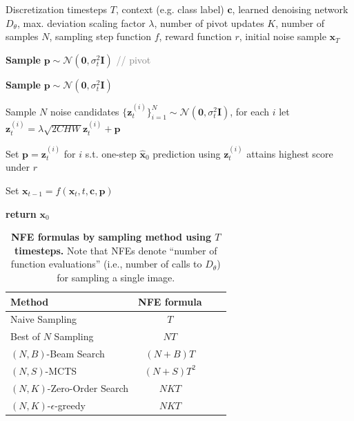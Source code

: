 \documentclass{article}
\newcommand{\x}{\mathbf{x}}
\begin{document}
\begin{algorithm}
\caption{Zero-Order Search}
\label{alg:zo}
\begin{algorithmic}[1]
\Require Discretization timesteps $T$, 
         context (e.g. class label) $\mathbf{c}$,
         learned denoising network $D_\theta$,
         max. deviation {scaling factor} $\lambda$, number of pivot updates $K$, number of samples $N$, sampling step function $f$, reward function $r$, initial noise sample $\x_T$

\State \textbf{Sample} $\mathbf{p} \sim \mathcal{N}(\mathbf{0},\sigma_t^2\mathbf{I})$ \textcolor{gray}{// pivot}

\vspace{1mm}

    \textbf{Sample} $\mathbf{p} \sim \mathcal{N}(\mathbf{0},\sigma_t^2\mathbf{I})$


        Sample $N$ noise candidates $\{\mathbf{z}^{(i)}_t\}_{i=1}^N \sim \mathcal{N}(\mathbf{0},\sigma_t^2\mathbf{I})$, for each $i$ let $\mathbf{z}^{(i)}_t = \lambda \sqrt{2CHW} \mathbf{z}^{(i)}_t + \mathbf{p}$
        
        Set $\mathbf{p} = \mathbf{z}^{(i)}_t$ for $i$ s.t. one-step $\hat{\x}_0$ prediction using $\mathbf{z}^{(i)}_t$ attains highest score under $r$
    
    \EndFor

    Set $\x_{t-1} = f(\x_t,t,\mathbf{c},\mathbf{p})$

    
\EndFor

\State \textbf{return} $\x_0$
\end{algorithmic}
\end{algorithm}

\begin{table}[h]
  \centering
  \caption{\small \textbf{NFE formulas by sampling method using $T$ timesteps.} Note that NFEs denote ``number of function evaluations'' (i.e., number of calls to $D_\theta$) for sampling a single image.}
  \label{tab:nfes}
  \begin{tabular}{lccc}
    \toprule
    \textbf{Method} & \textbf{NFE formula} \\
    \midrule
    Naive Sampling & $T$\\
    Best of $N$ Sampling & $NT$\\
    $(N,B)$-Beam Search & $(N+B)T$\\
    $(N,S)$-MCTS & $(N+S)T^2$\\
    $(N,K)$-Zero-Order Search &$NKT$\\
    $(N,K)$-$\epsilon$-greedy &$NKT$\\
    \bottomrule
  \end{tabular}
\end{table}
\end{document}
